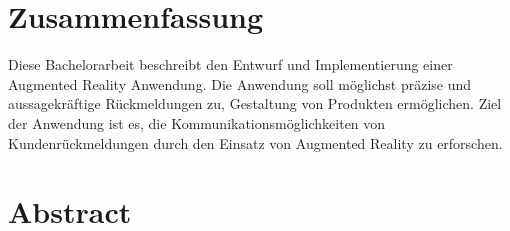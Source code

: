 \section*{Zusammenfassung}
Diese Bachelorarbeit beschreibt den Entwurf und Implementierung einer Augmented Reality Anwendung. Die Anwendung soll  möglichst präzise und aussagekräftige Rückmeldungen zu, Gestaltung von Produkten ermöglichen.  
Ziel der Anwendung  ist es, die Kommunikationsmöglichkeiten von Kundenrückmeldungen durch den Einsatz von Augmented Reality zu erforschen.

\section*{Abstract}
